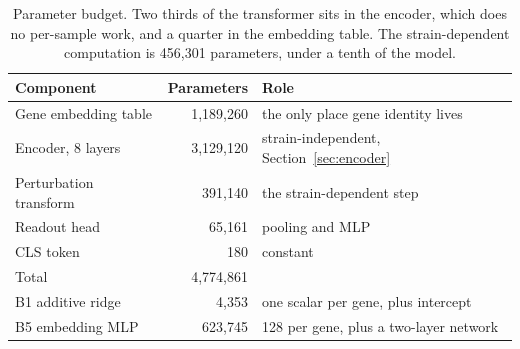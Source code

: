 \begin{table}[htbp]
\centering
\footnotesize
\caption{Parameter budget. Two thirds of the transformer sits in the encoder, which
does no per-sample work, and a quarter in the embedding table. The
strain-dependent computation is 456{,}301 parameters, under a tenth of the model.}
\label{tab:params}
\begin{tabular}{lrl}
\toprule
Component & Parameters & Role \\
\midrule
Gene embedding table & 1{,}189{,}260 & the only place gene identity lives \\
Encoder, 8 layers & 3{,}129{,}120 & strain-independent, Section~\ref{sec:encoder} \\
Perturbation transform & 391{,}140 & the strain-dependent step \\
Readout head & 65{,}161 & pooling and MLP \\
CLS token & 180 & constant \\
\midrule
Total & 4{,}774{,}861 & \\
\midrule
B1 additive ridge & 4{,}353 & one scalar per gene, plus intercept \\
B5 embedding MLP & 623{,}745 & 128 per gene, plus a two-layer network \\
\bottomrule
\end{tabular}
\end{table}
